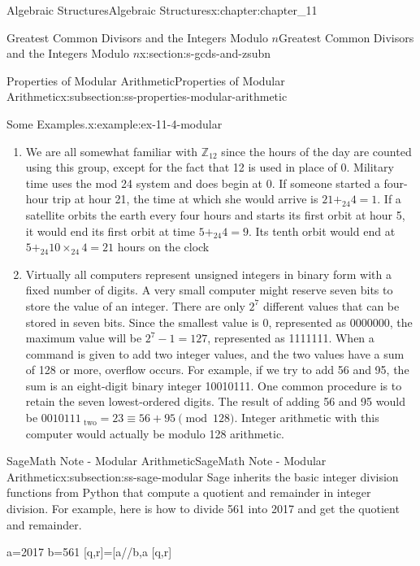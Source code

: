 \documentclass[twoside,10pt,]{book}
\numberwithin{equation}{section}
\begin{document}
\begin{chapterptx}{Algebraic Structures}{}{Algebraic Structures}{}{}{x:chapter:chapter_11}
\begin{sectionptx}{Greatest Common Divisors  and the Integers Modulo \(n\)}{}{Greatest Common Divisors  and the Integers Modulo \(n\)}{}{}{x:section:s-gcds-and-zsubn}
\begin{subsectionptx}{Properties of Modular Arithmetic}{}{Properties of Modular Arithmetic}{}{}{x:subsection:ss-properties-modular-arithmetic}
\begin{example}{Some Examples.}{x:example:ex-11-4-modular}
\begin{enumerate}[label=(\alph*)]
\item{}We are all somewhat familiar with \(\mathbb{Z}_{12}\) since the hours of the day are counted using this group, except for the fact that 12 is used in place of 0.  Military time uses the mod 24 system and does begin at 0.  If someone started a four-hour trip at hour 21, the time at which she would arrive is \(21 +_{24} 4 = 1\). If a satellite orbits the earth every four hours and starts its first orbit at hour 5, it would end its first orbit at time  \(5 +_{24}4 =9\). Its tenth orbit would end at \(5 +_{24} 10\times_{24}4 =21\) hours on the clock%
\item{}Virtually all computers represent unsigned integers in binary form with a fixed number of digits. A very small computer might reserve seven bits to store the value of an integer. There are only \(2^7\) different values that can be stored in seven bits. Since the smallest value is 0, represented as 0000000, the maximum value will be \(2^7 - 1 = 127\), represented as 1111111. When a command is given to add two integer values, and the two values have a sum of 128 or more, overflow occurs. For example, if we try to add 56 and 95, the sum is an eight-digit binary integer 10010111. One common procedure is to retain the seven lowest-ordered digits. The result of adding 56 and 95 would be \(0010111_{\textrm{ two}} = 23 \equiv  56 + 95\pmod{128}\). Integer arithmetic with this computer would actually be modulo 128 arithmetic.%
\end{enumerate}
%
\end{example}
\end{subsectionptx}
%
%
\typeout{************************************************}
\typeout{************************************************}
%
\begin{subsectionptx}{SageMath Note - Modular Arithmetic}{}{SageMath Note - Modular Arithmetic}{}{}{x:subsection:ss-sage-modular}
%
Sage inherits the basic integer division functions from Python that compute a quotient and remainder in integer division.  For example, here is how to divide 561 into 2017 and get the quotient and remainder.%
\begin{sageinput}
a=2017
b=561
[q,r]=[a//b,a%
[q,r]
\end{sageinput}
\begin{sageoutput}
[3, 334]
\end{sageoutput}

\end{subsectionptx}
\end{sectionptx}
\end{chapterptx}
\end{document}
